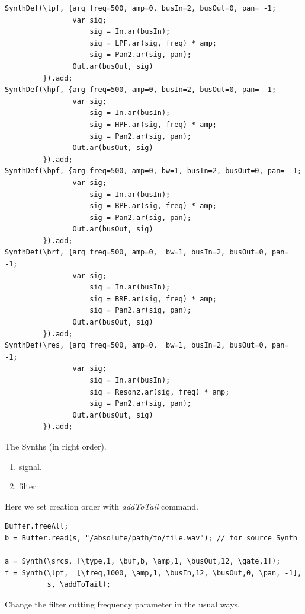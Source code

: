 \begin{lstlisting}[frame=single, caption=Filters models] 
SynthDef(\lpf, {arg freq=500, amp=0, busIn=2, busOut=0, pan= -1;
                var sig;
                    sig = In.ar(busIn);
                    sig = LPF.ar(sig, freq) * amp;
                    sig = Pan2.ar(sig, pan);
                Out.ar(busOut, sig)
         }).add;
SynthDef(\hpf, {arg freq=500, amp=0, busIn=2, busOut=0, pan= -1;
                var sig;
                    sig = In.ar(busIn);
                    sig = HPF.ar(sig, freq) * amp;
                    sig = Pan2.ar(sig, pan);
                Out.ar(busOut, sig)
         }).add;
SynthDef(\bpf, {arg freq=500, amp=0, bw=1, busIn=2, busOut=0, pan= -1;
                var sig;
                    sig = In.ar(busIn);
                    sig = BPF.ar(sig, freq) * amp;
                    sig = Pan2.ar(sig, pan);
                Out.ar(busOut, sig)
         }).add;
SynthDef(\brf, {arg freq=500, amp=0,  bw=1, busIn=2, busOut=0, pan= -1;
                var sig;
                    sig = In.ar(busIn);
                    sig = BRF.ar(sig, freq) * amp;
                    sig = Pan2.ar(sig, pan);
                Out.ar(busOut, sig)
         }).add;
SynthDef(\res, {arg freq=500, amp=0,  bw=1, busIn=2, busOut=0, pan= -1;
                var sig;
                    sig = In.ar(busIn);
                    sig = Resonz.ar(sig, freq) * amp;
                    sig = Pan2.ar(sig, pan);
                Out.ar(busOut, sig)
         }).add;
\end{lstlisting}

The Synths (in right order).

\begin{enumerate}
\tightlist 
\item signal.
\item filter.
\end{enumerate}

Here we set creation order with \textit{addToTail} command.

\begin{lstlisting}[frame=single] 
Buffer.freeAll;
b = Buffer.read(s, "/absolute/path/to/file.wav"); // for source Synth

a = Synth(\srcs, [\type,1, \buf,b, \amp,1, \busOut,12, \gate,1]);
f = Synth(\lpf,  [\freq,1000, \amp,1, \busIn,12, \busOut,0, \pan, -1], 
          s, \addToTail);
\end{lstlisting}

Change the filter cutting frequency parameter in the usual ways.

